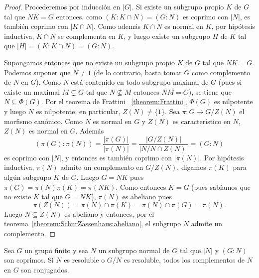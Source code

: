 \begin{proof}
	Procederemos por inducción en $|G|$. Si existe un subgrupo propio $K$ de
	$G$ tal que $NK=G$ entonces, como $(K:K\cap N)=(G:N)$ es coprimo con $|N|$,
	es también coprimo con $|K\cap N|$. Como además $K\cap N$ es normal en $K$,
	por hipótesis inductiva, $K\cap N$ se complementa en $K$, y luego existe un
	subgrupo $H$ de $K$ tal que $|H|=(K:K\cap N)=(G:N)$. 
	
	Supongamos entonces que no existe un subgrupo propio $K$ de $G$ tal que
	$NK=G$.  Podemos suponer que $N\ne1$ (de lo contrario, basta tomar $G$ como
	complemento de $N$ en $G$).  Como $N$ está contenido en todo subgrupo
	maximal de $G$ (pues si existe un maximal $M\subsetneq G$ tal que
	$N\not\subseteq M$ entonces $NM=G$), se tiene que $N\subseteq\Phi(G)$. Por
	el teorema de Frattini ~\ref{theorem:Frattini}, $\Phi(G)$ es nilpotente y
	luego $N$ es nilpotente; en particular, $Z(N)\ne\{1\}$. Sea $\pi\colon G\to
	G/Z(N)$ el morfismo canónico. Como $N$ es normal en $G$ y $Z(N)$ es
	característico en $N$, $Z(N)$ es normal en $G$.  Además 
	\[
	(\pi(G):\pi(N))=\frac{|\pi(G)|}{|\pi(N)|}=\frac{|G/Z(N)|}{|N/N\cap Z(N)|}=(G:N)
	\]
	es coprimo con $|N|$, y entonces es también coprimo con $|\pi(N)|$. Por hipótesis
	inductiva, $\pi(N)$ admite un complemento en $G/Z(N)$, digamos $\pi(K)$
	para algún subgrupo $K$ de $G$. Luego $G=NK$ pues 
	$\pi(G)=\pi(N)\pi(K)=\pi(NK)$. 
	Como entonces $K=G$ (pues sabíamos que no existe $K$ tal que $G=NK$), 
	$\pi(N)$ es abeliano pues 
	\[
		\pi(Z(N))=\pi(N)\cap\pi(K)=\pi(N)\cap\pi(G)=\pi(N).
	\]
	Luego $N\subseteq Z(N)$ es abeliano y entonces, por el
	teorema~\ref{theorem:SchurZassenhaus:abeliano}, el subgrupo $N$ admite un
	complemento. 
\end{proof}

\begin{theorem}
	\label{theorem:SchurZassenhaus:conjugacion}
	Sea $G$ un grupo finito y sea $N$ un subgrupo normal de $G$ tal que $|N|$ y
	$(G:N)$ son coprimos. Si $N$ es resoluble o $G/N$ es resoluble, todos los
	complementos de $N$ en $G$ son conjugados.
\end{theorem}

%
%
%

